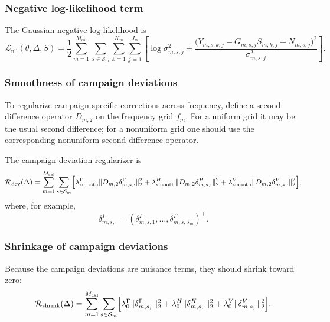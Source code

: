 \subsubsection{Negative log-likelihood term}

The Gaussian negative log-likelihood is
\begin{equation}
\mathcal L_{\mathrm{nll}}(\theta,\Delta,S)
=
\frac{1}{2}
\sum_{m=1}^{M_{\mathrm{cal}}}
\sum_{s\in\mathcal S_m}
\sum_{k=1}^{K_m}
\sum_{j=1}^{J_m}
\left[
\log \sigma_{m,s,j}^2
+
\frac{
\bigl(
Y_{m,s,k,j}
-
G_{m,s,j}S_{m,k,j}
-
N_{m,s,j}
\bigr)^2
}{
\sigma_{m,s,j}^2
}
\right].
\label{eq:nll}
\end{equation}

\subsubsection{Smoothness of campaign deviations}

To regularize campaign-specific corrections across frequency, define a
second-difference operator $D_{m,2}$ on the frequency grid $f_m$.
For a uniform grid it may be the usual second difference; for a nonuniform
grid one should use the corresponding nonuniform second-difference operator.

The campaign-deviation regularizer is
\begin{equation}
\mathcal R_{\mathrm{dev}}(\Delta)
=
\sum_{m=1}^{M_{\mathrm{cal}}}
\sum_{s\in\mathcal S_m}
\Bigl[
\lambda^\Gamma_{\mathrm{smooth}}
\|D_{m,2}\delta^\Gamma_{m,s,\cdot}\|_2^2
+
\lambda^H_{\mathrm{smooth}}
\|D_{m,2}\delta^H_{m,s,\cdot}\|_2^2
+
\lambda^V_{\mathrm{smooth}}
\|D_{m,2}\delta^V_{m,s,\cdot}\|_2^2
\Bigr],
\label{eq:Rdev-smooth}
\end{equation}
where, for example,
\[
\delta^\Gamma_{m,s,\cdot}
=
(\delta^\Gamma_{m,s,1},\dots,\delta^\Gamma_{m,s,J_m})^\top.
\]

\subsubsection{Shrinkage of campaign deviations}

Because the campaign deviations are nuisance terms, they should shrink toward
zero:
\begin{equation}
\mathcal R_{\mathrm{shrink}}(\Delta)
=
\sum_{m=1}^{M_{\mathrm{cal}}}
\sum_{s\in\mathcal S_m}
\Bigl[
\lambda^\Gamma_0
\|\delta^\Gamma_{m,s,\cdot}\|_2^2
+
\lambda^H_0
\|\delta^H_{m,s,\cdot}\|_2^2
+
\lambda^V_0
\|\delta^V_{m,s,\cdot}\|_2^2
\Bigr].
\label{eq:Rdev-shrink}
\end{equation}

